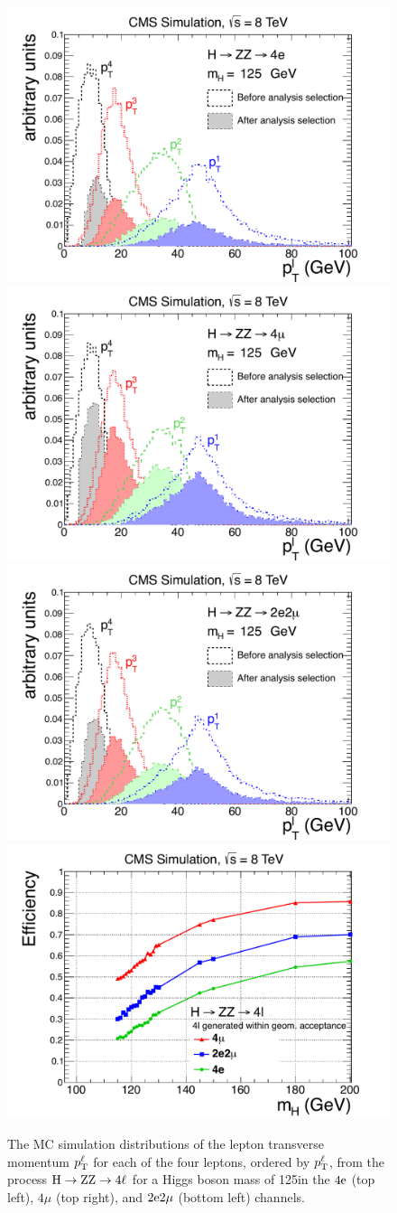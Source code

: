 \documentclass[11pt,twoside,a4paper,cmspaper,final,collab]{cms-tdr}
\begin{document}
\begin{figure}[htbp]
   \begin{center}
     \includegraphics[width=0.49\linewidth]{figures/HZZ_pteff_4e_MH125}
     \includegraphics[width=0.49\linewidth]{figures/HZZ_pteff_4mu_MH125}
     \includegraphics[width=0.49\linewidth]{figures/HZZ_pteff_2e2mu_MH125}
     \includegraphics[width=0.49\linewidth]{figures/HZZ_eff_2012_zoom}
     \caption{
The MC simulation distributions of the lepton transverse momentum $p_{\mathrm{T}}^{\ell}$ for each of
the four leptons, ordered by $p_{\mathrm{T}}^{\ell}$, from the process $\mathrm{H} \to  \mathrm{Z}\mathrm{Z} \to 4\ell$
for a Higgs boson mass of 125\GeV in the $4\mathrm{e}$ (top left), $4\mu$ (top
right), and $2\mathrm{e} 2\mu$ (bottom left) channels.
}
\end{center}
\end{figure}
\end{document}
